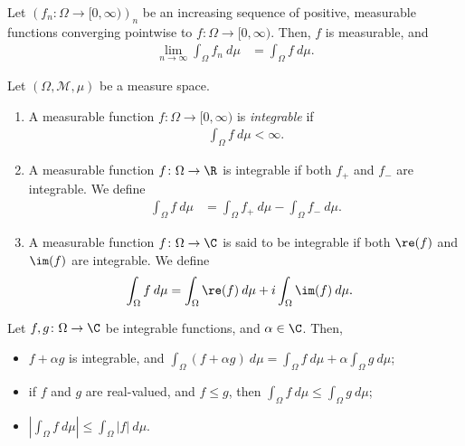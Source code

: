 \begin{theorem}
  Let $\left(f_n:\Omega\rightarrow [0,\infty)\right)_n$ be an increasing sequence of positive, measurable functions converging pointwise to $f\colon \Omega\rightarrow [0,\infty)$. Then, $f$ is measurable, and
  \begin{align*}
    \lim_{n\rightarrow\infty}\int_{\Omega}^{} f_n\:d\mu &= \int_{\Omega}^{} f\:d\mu.
  \end{align*}
\end{theorem}
\begin{definition}
  Let $\left(\Omega,\mathcal{M},\mu\right)$ be a measure space.
  \begin{enumerate}[(1)]
    \item A measurable function $f\colon \Omega\rightarrow [0,\infty)$ is \textit{integrable} if
      \begin{align*}
        \int_{\Omega}^{} f\:d\mu < \infty.
      \end{align*}
    \item A measurable function $f\colon \Omega\rightarrow \R$ is integrable if both $f_{+}$ and $f_{-}$ are integrable. We define
      \begin{align*}
        \int_{\Omega}^{} f\:d\mu &= \int_{\Omega}^{} f_{+}\:d\mu - \int_{\Omega}^{} f_{-}\:d\mu.
      \end{align*}
    \item A measurable function $f\colon \Omega\rightarrow \C$ is said to be integrable if both $\re(f)$ and $\im(f)$ are integrable. We define
      \begin{align*}
        \int_{\Omega}^{} f\:d\mu &= \int_{\Omega}^{} \re(f)\:d\mu + i\int_{\Omega}^{} \im(f)\:d\mu.
      \end{align*}
  \end{enumerate}
\end{definition}
\begin{fact}
  Let $f,g\colon \Omega\rightarrow \C$ be integrable functions, and $\alpha\in\C$. Then,
  \begin{itemize}
    \item $f + \alpha g$ is integrable, and $\displaystyle \int_{\Omega}^{} \left(f + \alpha g\right)\:d\mu = \int_{\Omega}f\:d\mu + \alpha\int_{\Omega}g\:d\mu$;
    \item if $f$ and $g$ are real-valued, and $f\leq g$, then $\displaystyle \int_{\Omega}^{} f\:d\mu \leq \int_{\Omega}^{} g\:d\mu$;
    \item $\displaystyle \left\vert \int_{\Omega}^{} f\:d\mu \right\vert\leq \int_{\Omega}^{} \left\vert f \right\vert\:d\mu$.
  \end{itemize}
\end{fact}

